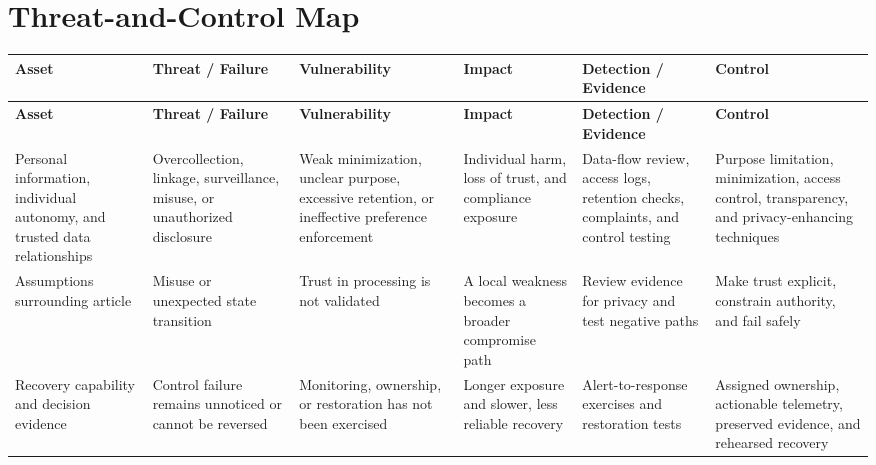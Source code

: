 \documentclass[11pt]{article}
\begin{document}
\section*{Threat-and-Control Map}
\begingroup\scriptsize\setlength{\tabcolsep}{2pt}
\begin{longtable}{>{\RaggedRight\arraybackslash}p{}>{\RaggedRight\arraybackslash}p{}>{\RaggedRight\arraybackslash}p{}>{\RaggedRight\arraybackslash}p{}>{\RaggedRight\arraybackslash}p{}>{\RaggedRight\arraybackslash}p{}}
\toprule\rowcolor{Navy}\color{white}\textbf{Asset} & \color{white}\textbf{Threat / Failure} & \color{white}\textbf{Vulnerability} & \color{white}\textbf{Impact} & \color{white}\textbf{Detection / Evidence} & \color{white}\textbf{Control}\\\midrule
\endfirsthead
\toprule\rowcolor{Navy}\color{white}\textbf{Asset} & \color{white}\textbf{Threat / Failure} & \color{white}\textbf{Vulnerability} & \color{white}\textbf{Impact} & \color{white}\textbf{Detection / Evidence} & \color{white}\textbf{Control}\\\midrule
\endhead
Personal information, individual autonomy, and trusted data relationships & Overcollection, linkage, surveillance, misuse, or unauthorized disclosure & Weak minimization, unclear purpose, excessive retention, or ineffective preference enforcement & Individual harm, loss of trust, and compliance exposure & Data-flow review, access logs, retention checks, complaints, and control testing & Purpose limitation, minimization, access control, transparency, and privacy-enhancing techniques\\\midrule
Assumptions surrounding article & Misuse or unexpected state transition & Trust in processing is not validated & A local weakness becomes a broader compromise path & Review evidence for privacy and test negative paths & Make trust explicit, constrain authority, and fail safely\\\midrule
Recovery capability and decision evidence & Control failure remains unnoticed or cannot be reversed & Monitoring, ownership, or restoration has not been exercised & Longer exposure and slower, less reliable recovery & Alert-to-response exercises and restoration tests & Assigned ownership, actionable telemetry, preserved evidence, and rehearsed recovery\\\midrule
\bottomrule
\end{longtable}
\endgroup
\end{document}
